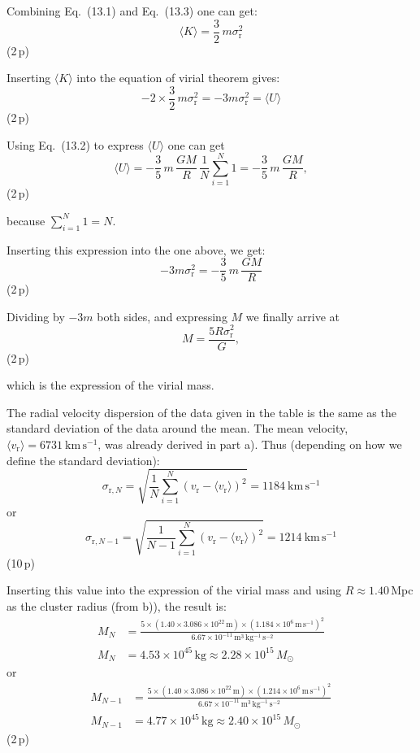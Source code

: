 \begin{description}
  Combining Eq.~(13.1) and Eq.~(13.3) one can get:
  \[ \langle K\rangle = \frac{3}{2}\,m\sigma_{\mathrm{r}}^2 \]
  \hfill(2\,p)

  Inserting $\langle K\rangle$ into the equation of virial theorem gives:
  \[ -2\times\frac{3}{2}\,m\sigma_{\mathrm{r}}^2
     = -3m\sigma_{\mathrm{r}}^2 = \langle U\rangle \]
  \hfill(2\,p)

  Using Eq.~(13.2) to express $\langle U\rangle$ one can get
  \[ \langle U\rangle
     = -\frac{3}{5}\,m\,\frac{GM}{R}\,\frac{1}{N}\sum_{i=1}^{N} 1
     = -\frac{3}{5}\,m\,\frac{GM}{R}, \]
  \hfill(2\,p)

  because $\sum_{i=1}^{N} 1 = N$.

  Inserting this expression into the one above, we get:
  \[ -3m\sigma_{\mathrm{r}}^2 = -\frac{3}{5}\,m\,\frac{GM}{R} \]
  \hfill(2\,p)

  Dividing by $-3m$ both sides, and expressing $M$ we finally arrive at
  \[ M = \frac{5R\sigma_{\mathrm{r}}^2}{G}, \]
  \hfill(2\,p)

  which is the expression of the virial mass.

\item[d)] The radial velocity dispersion of the data given in the table is
  the same as the standard deviation of the data around the mean. The mean
  velocity, $\langle v_{\mathrm{r}}\rangle = 6731\ \mathrm{km\,s^{-1}}$,
  was already derived in part a). Thus (depending on how we define the
  standard deviation):
  \[ \sigma_{\mathrm{r},N}
     = \sqrt{\frac{1}{N}\sum_{i=1}^{N}
       \left(v_{\mathrm{r}} - \langle v_{\mathrm{r}}\rangle\right)^2}
     = 1184\ \mathrm{km\,s^{-1}} \]
  or
  \[ \sigma_{\mathrm{r},N-1}
     = \sqrt{\frac{1}{N-1}\sum_{i=1}^{N}
       \left(v_{\mathrm{r}} - \langle v_{\mathrm{r}}\rangle\right)^2}
     = 1214\ \mathrm{km\,s^{-1}} \]
  \hfill(10\,p)

  Inserting this value into the expression of the virial mass and using
  $R \approx 1.40$\,Mpc as the cluster radius (from b)), the result is:
  \begin{align*}
  M_N &= \frac{5\times(1.40\times 3.086\times 10^{22}\,\mathrm{m})
    \times(1.184\times 10^{6}\,\mathrm{m\,s^{-1}})^2}
    {6.67\times 10^{-11}\,\mathrm{m^3\,kg^{-1}\,s^{-2}}}\\
  M_N &= 4.53\times 10^{45}\,\mathrm{kg}
    \approx 2.28\times 10^{15}\,M_\odot
  \end{align*}
  or
  \begin{align*}
  M_{N-1} &= \frac{5\times(1.40\times 3.086\times 10^{22}\,\mathrm{m})
    \times(1.214\times 10^{6}\,\mathrm{m\,s^{-1}})^2}
    {6.67\times 10^{-11}\,\mathrm{m^3\,kg^{-1}\,s^{-2}}}\\
  M_{N-1} &= 4.77\times 10^{45}\,\mathrm{kg}
    \approx 2.40\times 10^{15}\,M_\odot
  \end{align*}
  \hfill(2\,p)


\end{description}
